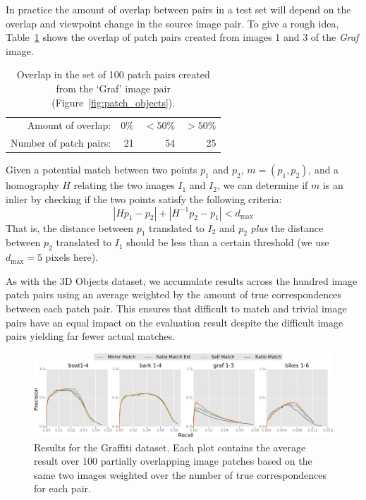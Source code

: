 \documentclass[review]{elsarticle}
\begin{document}
In practice the amount of overlap between pairs in a test set will depend on the overlap and viewpoint change in the source image pair.  To give a rough idea, Table~\ref{table:overlap} shows the overlap of patch pairs created from images 1 and 3 of the \emph{Graf} image.

\begin{table}[htb]
\caption{Overlap in the set of 100 patch pairs created from the `Graf' image pair (Figure~\ref{fig:patch_objects}).}
\label{table:overlap}
	\centering
\begin{tabular}{r*{3}{r}}
\hline
	Amount of overlap: & 0\% & $< 50$\% & $> 50$\%  \\
	\noalign{\smallskip}
	Number of patch pairs: & 21 & 54 & 25 \\
	\hline
\end{tabular}
\end{table}

Given a potential match between two points $p_1$ and 
$p_2$, $m = \left(p_1, p_2\right)$, and a homography $H$ relating the two images $I_1$ and $I_2$, we 
can determine if $m$ is an inlier by checking if the two points satisfy the following criteria:
\begin{equation*}
\left\vert H p_1 - p_2 \right\vert + \left\vert H^{-1}p_2 - p_1 \right\vert < d_{\max}
\end{equation*}
That is, the distance between $p_1$ translated to $I_2$ and $p_2$ 
\emph{plus} the distance between $p_2$ translated to $I_1$ should be 
less than a certain threshold (we use $d_{\max}=5$ pixels here).

As with the 3D Objects dataset, we accumulate results across the hundred image patch pairs using an average weighted by the amount of true correspondences between each patch pair. This ensures that difficult to match and trivial image pairs have an equal impact on the evaluation result despite the difficult image pairs yielding far fewer actual matches.
\begin{figure}[t]
    \centering
    \includegraphics[width=\columnwidth]{images/results_acr_patches}
    \caption{Results for the Graffiti dataset. Each plot contains the
average result over 100 partially overlapping image patches based on the same
two images weighted over the number of true correspondences for each pair.}
    \label{fig:patches}
\end{figure}
\end{document}
